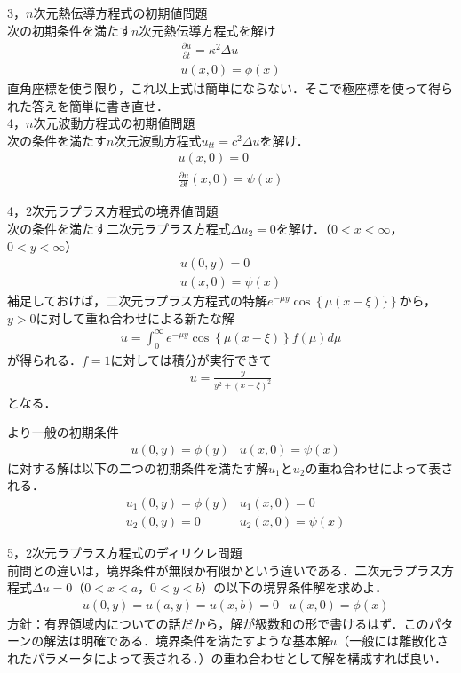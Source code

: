\documentclass[a4j]{jarticle}
\begin{document}
3，$n$次元熱伝導方程式の初期値問題\\
次の初期条件を満たす$n$次元熱伝導方程式を解け
\begin{align*}
 \frac{\partial u}{\partial t}=\kappa^2\Delta u\\
 u(x,0)=\phi (x)
\end{align*}
直角座標を使う限り，これ以上式は簡単にならない．そこで極座標を使って得られた答えを簡単に書き直せ．\\




4，$n$次元波動方程式の初期値問題\\
次の条件を満たす$n$次元波動方程式$u_{tt}=c^2\Delta u$を解け．
\begin{align*}
 u(x,0)=0\\
 \frac{\partial u}{\partial t}(x,0)=\psi (x)
\end{align*}


4，$2$次元ラプラス方程式の境界値問題\\
次の条件を満たす二次元ラプラス方程式$\Delta u_2=0$を解け．（$0<x<\infty$，$0<y<\infty$）
\begin{align*}
 u(0,y)=0\\
 u(x,0)=\psi (x)
\end{align*}
補足しておけば，二次元ラプラス方程式の特解$e^{-\mu y}\cos \left\{\mu (x-\xi)\}\right\}$から，$y>0$に対して重ね合わせによる新たな解
\begin{align*}
 u=\int_{0}^{\infty}e^{-\mu y}\cos\left\{\mu (x-\xi)\right\}f(\mu)d\mu
\end{align*}
が得られる．$f=1$に対しては積分が実行できて
\begin{align*}
u=\frac{y}{y^2+(x-\xi)^2}
\end{align*}
となる．

より一般の初期条件
\begin{align*}
 &u(0,y)=\phi (y)&u(x,0)=\psi (x)
\end{align*}
に対する解は以下の二つの初期条件を満たす解$u_1$と$u_2$の重ね合わせによって表される．
\begin{align*}
 &u_1(0,y)=\phi (y)&u_1(x,0)=0 \\
  &u_2(0,y)=0&u_2(x,0)=\psi (x)
\end{align*}


5，$2$次元ラプラス方程式のディリクレ問題\\
前問との違いは，境界条件が無限か有限かという違いである．二次元ラプラス方程式$\Delta u=0$（$0<x<a$，$0<y<b$）の以下の境界条件解を求めよ．
\begin{align*}
 &u(0,y)=u(a,y)=u(x,b)=0&u(x,0)=\phi (x)
\end{align*}
方針：有界領域内についての話だから，解が級数和の形で書けるはず．このパターンの解法は明確である．境界条件を満たすような基本解$u$（一般には離散化されたパラメータによって表される．）の重ね合わせとして解を構成すれば良い．
\end{document}
